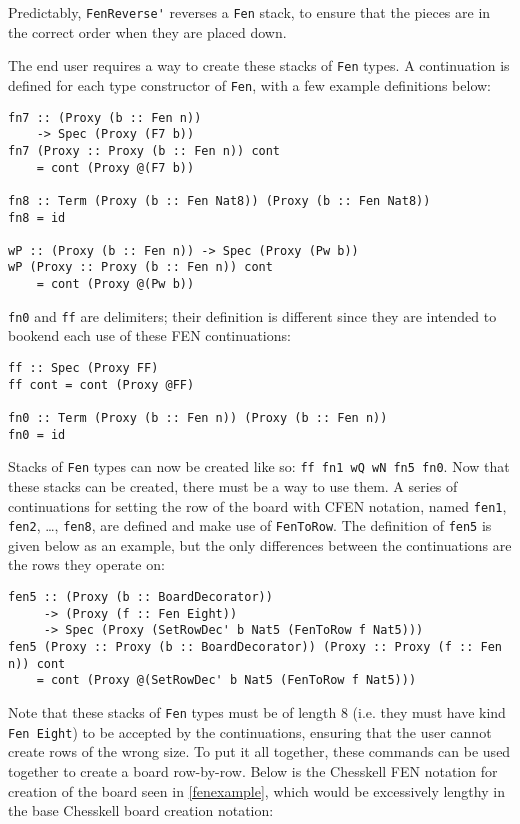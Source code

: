 \documentclass[12pt, a4paper, bibliography=totocnumbered]{scrreprt}
\newcommand{\inline}[1]{\lstinline[basicstyle=\ttfamily\footnotesize]{#1}}
\begin{document}
Predictably, \inline{FenReverse'} reverses a \inline{Fen} stack, to ensure that the pieces are in the correct order when they are placed down.

The end user requires a way to create these stacks of \inline{Fen} types. A continuation is defined for each type constructor of \inline{Fen}, with a few example definitions below:

\begin{lstlisting}
fn7 :: (Proxy (b :: Fen n))
    -> Spec (Proxy (F7 b))
fn7 (Proxy :: Proxy (b :: Fen n)) cont
    = cont (Proxy @(F7 b))

fn8 :: Term (Proxy (b :: Fen Nat8)) (Proxy (b :: Fen Nat8))
fn8 = id

wP :: (Proxy (b :: Fen n)) -> Spec (Proxy (Pw b))
wP (Proxy :: Proxy (b :: Fen n)) cont
    = cont (Proxy @(Pw b))
\end{lstlisting}

\inline{fn0} and \inline{ff} are delimiters; their definition is different since they are intended to bookend each use of these FEN continuations:

\begin{lstlisting}
ff :: Spec (Proxy FF)
ff cont = cont (Proxy @FF)

fn0 :: Term (Proxy (b :: Fen n)) (Proxy (b :: Fen n))
fn0 = id
\end{lstlisting}

Stacks of \inline{Fen} types can now be created like so: \inline{ff fn1 wQ wN fn5 fn0}. Now that these stacks can be created, there must be a way to use them. A series of continuations for setting the row of the board with CFEN notation, named \inline{fen1}, \inline{fen2}, \dots, \inline{fen8}, are defined and make use of \inline{FenToRow}. The definition of \inline{fen5} is given below as an example, but the only differences between the continuations are the rows they operate on:

\begin{lstlisting}
fen5 :: (Proxy (b :: BoardDecorator))
     -> (Proxy (f :: Fen Eight))
     -> Spec (Proxy (SetRowDec' b Nat5 (FenToRow f Nat5)))
fen5 (Proxy :: Proxy (b :: BoardDecorator)) (Proxy :: Proxy (f :: Fen n)) cont
    = cont (Proxy @(SetRowDec' b Nat5 (FenToRow f Nat5)))
\end{lstlisting}

Note that these stacks of \inline{Fen} types must be of length 8 (i.e. they must have kind \inline{Fen Eight}) to be accepted by the continuations, ensuring that the user cannot create rows of the wrong size. To put it all together, these commands can be used together to create a board row-by-row. Below is the Chesskell FEN notation for creation of the board seen in \cref{fenexample}, which would be excessively lengthy in the base Chesskell board creation notation:
\end{document}
